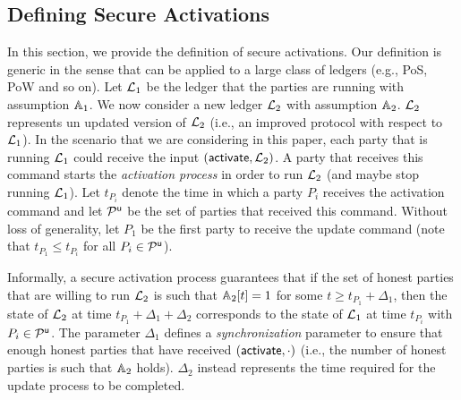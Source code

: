 \subsection{Defining Secure Activations}
In this section, we provide the definition of secure activations. Our definition is generic in the sense that can be applied to a large class of ledgers 
(e.g., PoS, PoW and so on).
Let $\mathcal{L}_1$ be the ledger that the parties are running with assumption $\mathbb{A}_1$. We now consider a new ledger $\mathcal{L}_2$ with assumption $\mathbb{A}_2$.
$\mathcal{L}_2$ represents un updated version of $\mathcal{L}_2$ (i.e., an improved protocol with respect to $\mathcal{L}_1$).
In the scenario that we are considering in this paper, each party that is running $\mathcal{L}_1$ could receive the input $(\mathsf{activate}, \mathcal{L}_2)$. A party
that receives this command starts the \emph{activation process}
in order to run $\mathcal{L}_2$ (and maybe stop running $\mathcal{L}_1$).
Let $t_{P_i}$ denote the time in which 
a party $P_i$ receives the activation command and let $\mathcal{P}^\mathsf{u}$ be the set of parties that received this command. Without loss of generality, let $P_1$ be the first party to receive the update command (note that $t_{P_1}\leq t_{P_i}$ for all $P_i\in\mathcal{P}^\mathsf{u}$).

Informally, a secure activation process guarantees that if the set of honest parties that are willing to run $\mathcal{L}_2$ 
is such that $\mathbb{A}_2[t]=1$ for some $t\geq t_{P_1}+\Delta_1$, then
the state of $\mathcal{L}_2$ at time $t_{P_1}+\Delta_1+\Delta_2$ corresponds to the state of $\mathcal{L}_1$ at time $t_{P_i}$ with $P_i\in\mathcal{P}^\mathsf{u}$.
The parameter $\Delta_1$ defines a \emph{synchronization} parameter to ensure that enough honest parties that have received $(\mathsf{activate},\cdot)$ (i.e., the number of honest parties is such that $\mathbb{A}_2$ holds). $\Delta_2$ instead represents the time required for the update process to be completed.

 

